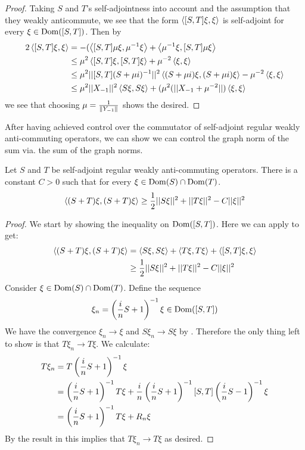 \begin{proof}
	Taking $S$ and $T$'s self-adjointness into account and the assumption that they weakly anticommute, we see that the form $\left \langle [S,T]\xi,\xi \right \rangle$ is self-adjoint for every $\xi \in \operatorname{Dom}([S,T])$. Then by 
	\begin{align*}
		2\left \langle [S,T]\xi,\xi \right \rangle&=-(\left \langle [S,T]\mu\xi,\mu^{-1}\xi \right \rangle+\left \langle \mu^{-1}\xi,[S,T]\mu\xi \right \rangle \\
		&\leq \mu^2 \left \langle [S,T]\xi,[S,T]\xi \right \rangle+\mu^{-2}\left \langle \xi,\xi \right \rangle \\
		&\leq \mu^2 ||[S,T](S+\mu i)^{-1}||^2\left \langle (S+\mu i)\xi,(S+\mu i)\xi \right \rangle-\mu^{-2}\left \langle \xi,\xi \right \rangle \\
		&\leq \mu^2||X_{-1}||^2 \left \langle S\xi,S\xi \right \rangle+(\mu^2(||X_{-1}+\mu^{-2}||)\left \langle \xi,\xi \right \rangle
	\end{align*}
	we see that choosing $\mu=\frac{1}{\left \Vert Y_{-1} \right \Vert}$ shows the desired.
\end{proof}
After having achieved control over the commutator of self-adjoint regular weakly anti-commuting operators, we can show we can control the graph norm of the sum via. the sum of the graph norms. 
\begin{lemma}\label{estimatelemma2}
	Let $S$ and $T$ be self-adjoint regular weakly anti-commuting operators. There is a constant $C>0$ such that for every $\xi \in \operatorname{Dom}(S)\cap \operatorname{Dom}(T)$. 
	\begin{align*}
		\left \langle (S+T)\xi,(S+T)\xi \right \rangle\geq \frac{1}{2}||S\xi||^2+||T\xi||^2-C||\xi||^2
	\end{align*}
\end{lemma}
\begin{proof}
	We start by showing the inequality on $\operatorname{Dom}([S,T])$. Here we can apply  to get: 
	\begin{align*}
		\left \langle (S+T)\xi,(S+T)\xi \right \rangle&=\left \langle S\xi,S\xi \right \rangle+\left \langle T\xi,T\xi \right \rangle+\left \langle [S,T]\xi,\xi \right \rangle \\
		&\geq \frac{1}{2} ||S\xi||^2+||T\xi||^2-C||\xi||^2
	\end{align*}
	Consider $\xi\in \operatorname{Dom}(S)\cap \operatorname{Dom}(T)$. Define the sequence
	\begin{align*}
		\xi_n=\left ( \frac{i}{n}S+1 \right )^{-1}\xi \in \operatorname{Dom}([S,T])
	\end{align*}
	We have the convergence $\xi_n\to \xi$ and $S\xi_n \to S\xi$ by . Therefore the only thing left to show is that $T\xi_n\to T\xi$. We calculate:
	\begin{align*}
		T\xi_n&=T\left ( \frac{i}{n}S+1 \right )^{-1}\xi \\
		&=\left ( \frac{i}{n}S+1 \right )^{-1}T\xi+\frac{i}{n}\left ( \frac{i}{n}S+1 \right )^{-1}[S,T]\left ( \frac{i}{n}S-1 \right )^{-1}\xi \\
		&=\left ( \frac{i}{n}S+1 \right )^{-1}T\xi+R_n\xi
	\end{align*}
	By the result in  this implies that $T\xi_n\to T\xi$ as desired. 
\end{proof}
